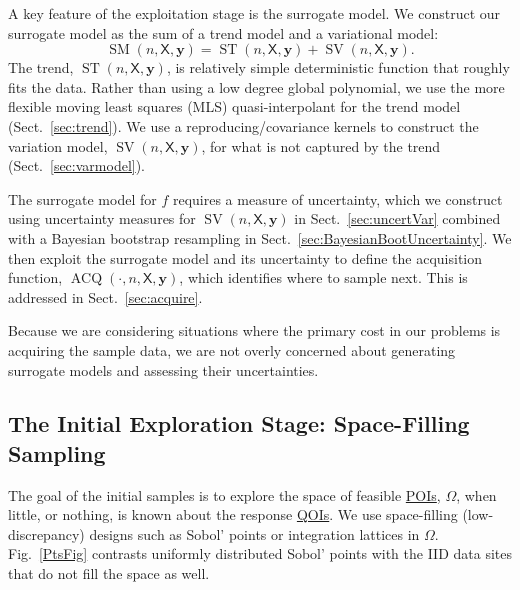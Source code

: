\documentclass[11pt]{NSFamsart}
\newcommand{\QOIs}{\hyperlink{QOIlink}{QOIs}\xspace}
\newcommand{\POIs}{\hyperlink{POIlink}{POIs}\xspace}
\DeclareMathOperator{\SURR}{SM} %
\DeclareMathOperator{\STREND}{ST} %
\DeclareMathOperator{\SVAR}{SV} %
\DeclareMathOperator{\VAL}{ACQ}
\newcommand{\mX}{\mathsf{X}}
\newcommand{\by}{{\boldsymbol{y}}}
\begin{document}
A key feature of the exploitation stage is the surrogate model. We construct our surrogate model as the sum of a trend model and a variational model: 
\begin{equation*}
\SURR(n,\mX,\by) = \STREND(n,\mX,\by) + \SVAR(n,\mX,\by). 
\end{equation*} 
The trend, $\STREND(n,\mX,\by)$, is relatively simple deterministic function that roughly fits the data. Rather than using a low degree global polynomial, we use the more flexible moving least squares (MLS) quasi-interpolant for the trend model (Sect.\ \ref{sec:trend}). We use a reproducing/covariance kernels to construct the variation model, $\SVAR(n,\mX,\by)$, for what is not captured by the trend (Sect.\ \ref{sec:varmodel}). 

The surrogate model for $f$ requires a measure of uncertainty, which we construct using uncertainty measures for $\SVAR(n,\mX,\by)$ in Sect.\ \ref{sec:uncertVar} combined with a Bayesian bootstrap resampling in Sect.\ \ref{sec:BayesianBootUncertainty}. We then exploit the surrogate model and its uncertainty to define the acquisition function, $\VAL(\cdot, n,\mX,\by)$, which identifies where to sample next. This is addressed in Sect.\ \ref{sec:acquire}. 

Because we are considering situations where the primary cost in our problems is acquiring the sample data, we are not overly concerned about generating surrogate models and assessing their uncertainties.


\subsection{The Initial Exploration Stage: Space-Filling Sampling} \label{sec:Explore}

The goal of the initial samples is to explore the space of feasible \POIs, $\Omega$, when little, or nothing, is known about the response \QOIs. We use space-filling (low-discrepancy) designs such as Sobol' points \cite{DicPil10a} or integration lattices \cite{SloJoe94, DicEtal14a} in $\Omega$.  Fig.\ \ref{PtsFig} contrasts uniformly distributed Sobol' points with the IID data sites that do not fill the space as well.
\end{document}
